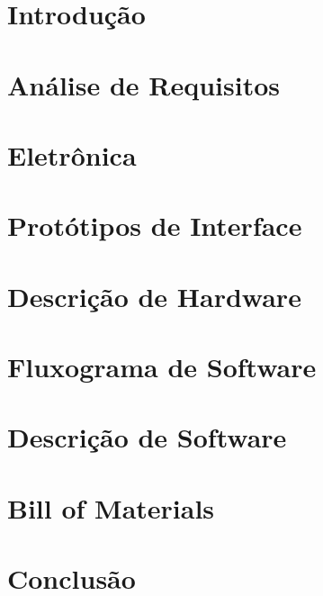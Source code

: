 \documentclass[a4paper, 11pt]{article}
\begin{document}
\selectfont


\tableofcontents
\newpage
\section{Introdução}


\section{Análise de Requisitos}


\section{Eletrônica}


\section{Protótipos de Interface}


\section{Descrição de Hardware}


\section{Fluxograma de Software}


\section{Descrição de Software}


\section{Bill of Materials}


\section{Conclusão}

\end{document}
